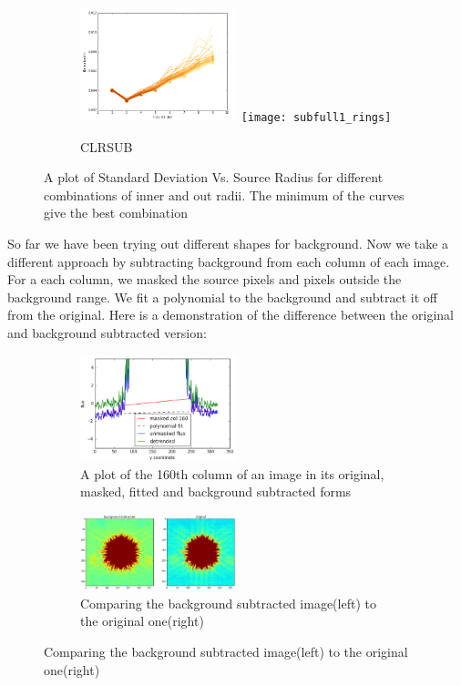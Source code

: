\documentclass[conference]{IEEEtran}
\begin{document}
\begin{figure}[H]
            \begin{subfigure}{3}
                \includegraphics[width = 0.5\textwidth]{Radius_CLR}
                \texttt{[image: subfull1\_rings]}
                \caption{CLRSUB}
            \end{subfigure}
            \caption{A plot of Standard Deviation Vs. Source Radius for different combinations of inner and out radii. The minimum of the curves give the best combination}
        \end{figure}
        
        So far we have been trying out different shapes for background. Now we take a different approach by subtracting background from each column of each image. For a each column, we masked the source pixels and pixels outside the background range. We fit a polynomial to the background and subtract it off from the original. Here is a demonstration of the difference between the original and background subtracted version:
        
        \begin{figure}[H]
            \centering
            \begin{subfigure}{1}
                \includegraphics[width = 0.5\textwidth]{col_plot}
                \caption{A plot of the 160th column of an image in its original, masked, fitted and background subtracted forms}
            \end{subfigure}
        
            \begin{subfigure}{2}
                \includegraphics[width = 0.5\textwidth]{col_image}
                \caption{Comparing the background subtracted image(left) to the original one(right)}
            \end{subfigure}
        \end{figure}
        
\end{document}
